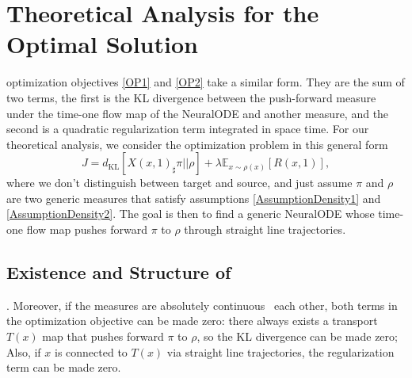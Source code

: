 \section{Theoretical Analysis for the Optimal Solution}
 optimization objectives \ref{OP1} and \ref{OP2} take a
similar form. %
They are the sum of two terms, the first is the KL divergence between
the push-forward measure under the time-one flow map of the NeuralODE
and another measure, and the second %
is a quadratic regularization term integrated in space time. For our
theoretical analysis, we consider the optimization problem in this
general form
\begin{equation}\label{eq:OP}
J = d_\text{KL}[X(x,1)_\sharp\pi||\rho] + \lambda\mathbb{E}_{x\sim\rho(x)}[R(x,1)], \tag{OP}
\end{equation}
where we don't distinguish between target and source, and just assume $\pi$ and $\rho$ are two generic measures that satisfy assumptions \ref{AssumptionDensity1} and \ref{AssumptionDensity2}. The goal is then to find a generic NeuralODE whose time-one flow map pushes forward $\pi$ to $\rho$ through straight line trajectories. 
\subsection{Existence and Structure of %
}
.  Moreover, if the measures are absolutely
continuous \ each other, both terms in the optimization
objective can be made zero: there always exists a transport $T(x)$ map
that pushes forward $\pi$ to $\rho$, so the KL divergence can be made
zero; Also, if $x$ is connected to $T(x)$ via straight line
trajectories, the regularization term can be made zero.


